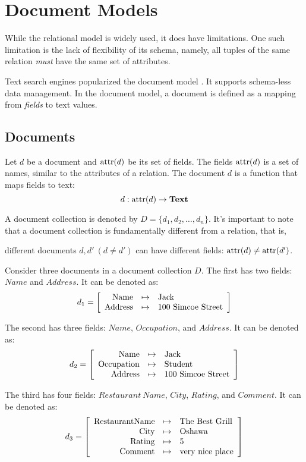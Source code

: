 \section{Document Models}
While the relational model is widely used, it does have limitations. One such limitation is the lack of flexibility of its schema, namely, all tuples of the same relation {\em must} have the same set of attributes.

Text search engines popularized the document model \cite{croft2010search}. It supports schema-less data management.  In the document model, a document is defined as
a mapping from {\em fields} to text values.

\subsection{Documents}
Let $d$ be a document and $\operatorname{attr}(d)$ be its set of fields. The fields $\operatorname{attr}(d)$ is a set of names, similar to the attributes of a relation.
The document $d$ is a function that maps fields to text:
$$ d : \operatorname{attr}(d) \to \mathbf{Text} $$

A document collection is denoted by $D = \{d_1, d_2, \dots, d_n\}$.
It's important to note that a document collection is fundamentally different from a relation, that is, 
\begin{center}
    different documents $d, d'\ (d\not=d')$ can have different fields:
$\operatorname{attr}(d)\not=\operatorname{attr}(d')$.
\end{center}

\begin{example} \label{ex2}
Consider three documents in a document collection $D$. The first has two fields: $Name$ and $Address$. It can be denoted as:
$$
d_1 = \left[\begin{array}{rcl}
\mathrm{Name} & \mapsto & \makebox{Jack} \\
\mathrm{Address} & \mapsto & \makebox{100 Simcoe Street} \\
\end{array}\right]
$$

The second has three fields: $Name$, $Occupation$, and $Address$. It can be denoted as:
$$
d_2 = \left[\begin{array}{rcl}
\mathrm{Name} & \mapsto & \makebox{Jack} \\
\mathrm{Occupation} & \mapsto & \makebox{Student} \\
\mathrm{Address} & \mapsto & \makebox{100 Simcoe Street} \\
\end{array}\right]
$$

The third has four fields: $Restaurant\ Name$, $City$, $Rating$, and $Comment$. It can be denoted as:
$$
d_3 = \left[\begin{array}{rcl}
\mathrm{RestaurantName} & \mapsto & \makebox{The Best Grill} \\
\mathrm{City} & \mapsto & \makebox{Oshawa} \\
\mathrm{Rating} & \mapsto & \makebox{5} \\
\mathrm{Comment} & \mapsto & \makebox{very nice place} \\
\end{array}\right]
$$
\end{example}

